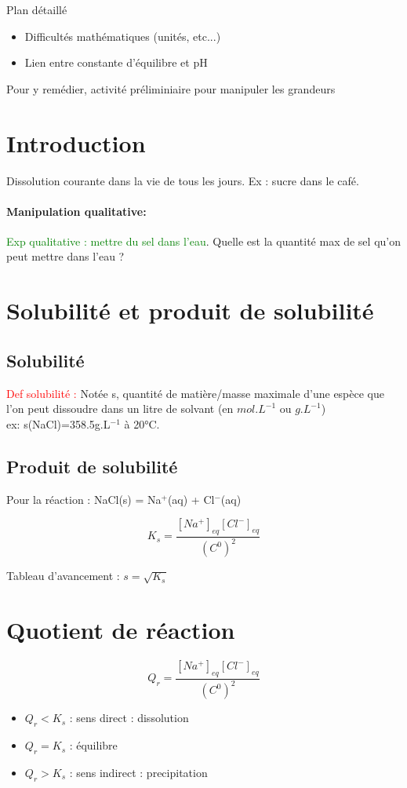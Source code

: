 \begin{reportBlock}{Plan détaillé}
\begin{itemize}
\item Difficultés mathématiques (unités, etc...)
\item Lien entre constante d'équilibre et pH
\end{itemize}
Pour y remédier, activité préliminiaire pour manipuler les grandeurs
\section*{Introduction }
Dissolution courante dans la vie de tous les jours. Ex : sucre dans le café.\\
\paragraph*{Manipulation qualitative:} \textcolor{green}{Exp qualitative : mettre du sel dans l'eau}. Quelle est la quantité max de sel qu'on peut mettre dans l'eau ?

\section{Solubilité et produit de solubilité}

\subsection{Solubilité}

\textcolor{red}{Def solubilité : }Notée s, quantité de matière/masse maximale d'une espèce que l'on peut dissoudre dans un litre de solvant (en $mol.L^{-1}$ ou $g.L^{-1}$)\\
ex: s(NaCl)=358.5g.L$^{-1}$ à 20°C.

\subsection{Produit de solubilité}
Pour la réaction : NaCl(s) = Na$^+$(aq) + Cl$^-$(aq)

\begin{equation}
    K_s = \frac{[Na^+]_{eq}[Cl^-]_{eq}}{(C^{0})^2}
    \end{equation}

Tableau d'avancement : $s=\sqrt{K_s}$

\section{Quotient de réaction}

\begin{equation}
    Q_r = \frac{[Na^+]_{eq}[Cl^-]_{eq}}{(C^{0})^2}
\end{equation}
\begin{itemize}
    \item $Q_r<K_s$ : sens direct : dissolution
    \item $Q_r=K_s$ : équilibre
    \item  $Q_r>K_s$ : sens indirect : precipitation
\end{itemize}

\end{reportBlock}
